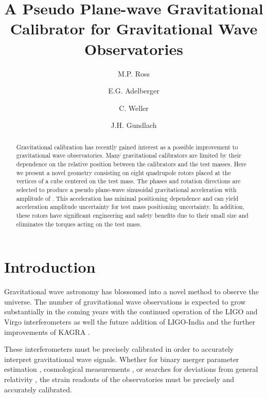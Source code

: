 \documentclass[twocolumn]{revtex4-1}
\begin{document}
\title{A Pseudo Plane-wave Gravitational Calibrator for Gravitational Wave Observatories}

\author{M.P. Ross}
\author{E.G. Adelberger}
\author{C. Weller}
\author{J.H. Gundlach}

\begin{abstract}

Gravitational calibration has recently gained interest as a possible improvement to gravitational wave observatories. Many gravitational calibrators are limited by their dependence on the relative position between the calibrators and the test masses. Here we present a novel geometry consisting on eight quadrupole rotors placed at the vertices of a cube centered on the test mass. The phases and rotation directions are selected to produce a pseudo plane-wave  sinusoidal gravitational acceleration with amplitude of . This acceleration has minimal positioning dependence and can yield  acceleration amplitude uncertainty for \added{$\sim$1 cm} test mass positioning uncertainty. In addition, these rotors have significant engineering and safety benefits due to their small size and eliminates the torques acting on the test mass.

\end{abstract}

\maketitle

\section{Introduction}

Gravitational wave astronomy has blossomed into a novel method to observe the universe. The number of gravitational wave observations is expected to grow substantially in the coming years with the continued operation of the LIGO \cite{aLIGO} and Virgo \cite{virgo} interferometers as well the future addition of LIGO-India \cite{ligo-india} and the further improvements of KAGRA \cite{kagra}. 

These interferometers must be precisely calibrated in order to accurately interpret gravitational wave signals. Whether for binary merger parameter estimation \cite{abbott2020population}, cosmological measurements \cite{abbott2021gravitational, ligo2017gravitational}, or searches for deviations from general relativity \cite{abbott2020tests}, the strain readouts of the observatories must be precisely and accurately calibrated.
\end{document}
